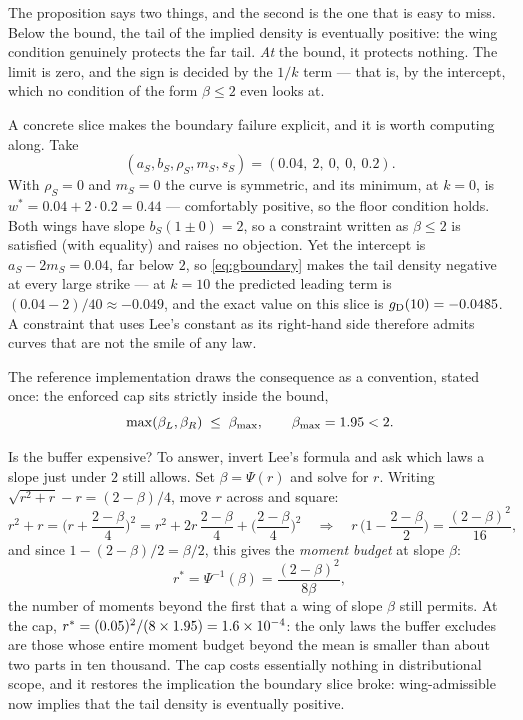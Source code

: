 The proposition says two things, and the second is the one that is easy
to miss.  Below the bound, the tail of the implied density is
eventually positive: the wing condition genuinely protects the far
tail.  \emph{At} the bound, it protects nothing.  The limit is zero,
and the sign is decided by the $1/k$ term --- that is, by the
intercept, which no condition of the form $\beta\le2$ even looks at.

A concrete slice makes the boundary failure explicit, and it is worth
computing along.  Take
\[
(a_S,b_S,\rho_S,m_S,s_S)=(0.04,\ 2,\ 0,\ 0,\ 0.2).
\]
With $\rho_S=0$ and $m_S=0$ the curve is symmetric, and its minimum,
at $k=0$, is $w^*=0.04+2\cdot0.2=0.44$ --- comfortably positive, so the
floor condition holds.  Both wings have slope $b_S(1\pm0)=2$, so a
constraint written as $\beta\le2$ is satisfied (with equality) and
raises no objection.  Yet the intercept is $a_S-2m_S=0.04$, far below
$2$, so \eqref{eq:gboundary} makes the tail density negative at every
large strike --- at $k=10$ the predicted leading term is
$(0.04-2)/40\approx-0.049$, and the exact value on this slice is
$g_{\rm D}(10)=-0.0485$.  A constraint that uses Lee's
constant as its right-hand side therefore admits curves that are not
the smile of any law.

The reference implementation draws the consequence as a convention,
stated once: the enforced cap sits strictly inside the bound,
\begin{equation}
\max(\beta_L,\beta_R)\;\le\;\beta_{\max},\qquad
\beta_{\max}=1.95<2 .
\label{eq:leecap}
\end{equation}

Is the buffer expensive?  To answer, invert Lee's formula and ask which
laws a slope just under $2$ still allows.  Set $\beta=\Psi(r)$ and
solve for $r$.  Writing $\sqrt{r^2+r}-r=(2-\beta)/4$, move $r$ across
and square:
\[
r^2+r=\Big(r+\frac{2-\beta}{4}\Big)^{2}
=r^2+2r\,\frac{2-\beta}{4}+\Big(\frac{2-\beta}{4}\Big)^{2}
\quad\Longrightarrow\quad
r\,\Big(1-\frac{2-\beta}{2}\Big)=\frac{(2-\beta)^2}{16},
\]
and since $1-(2-\beta)/2=\beta/2$, this gives the \emph{moment budget}
at slope $\beta$:
\begin{equation}
r^*=\Psi^{-1}(\beta)=\frac{(2-\beta)^2}{8\beta},
\label{eq:momentmap}
\end{equation}
the number of moments beyond the first that a wing of slope $\beta$
still permits.  At the cap,
$r^*=(0.05)^2/(8\times1.95)=1.6\times10^{-4}$: the only laws the buffer
excludes are those whose entire moment budget beyond the mean is
smaller than about two parts in ten thousand.  The cap costs
essentially nothing in distributional scope, and it restores the
implication the boundary slice broke: wing-admissible now implies that
the tail density is eventually positive.

